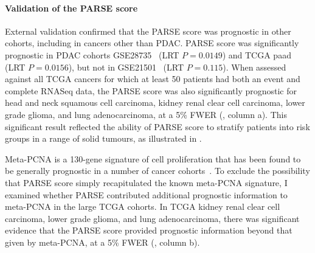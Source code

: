 \documentclass[dissertation.tex]{subfiles}
\begin{document}
\paragraph{Validation of the \acrshort{PARSE} score}
External validation confirmed that the \gls{PARSE} score was prognostic in other cohorts, including in cancers other than \gls{PDAC}.  \Gls{PARSE} score was significantly prognostic in \gls{PDAC} cohorts GSE28735~\cite{Zhang2013} (LRT $P = 0.0149$) and \gls{TCGA} paad (LRT $P = 0.0156$), but not in GSE21501~\cite{Stratford2010} (LRT $P = 0.115$).  When assessed against all \gls{TCGA} cancers for which at least 50 patients had both an event and complete RNASeq data, the \gls{PARSE} score was also significantly prognostic for head and neck squamous cell carcinoma, kidney renal clear cell carcinoma, lower grade glioma, and lung adenocarcinoma, at a 5\% \gls{FWER} (, column a).  This significant result reflected the ability of \acrshort{PARSE} score to stratify patients into risk groups in a range of solid tumours, as illustrated in .

Meta-PCNA is a 130-gene signature of cell proliferation that has been found to be generally prognostic in a number of cancer cohorts~\cite{Venet2011}.  To exclude the possibility that \gls{PARSE} score simply recapitulated the known meta-PCNA signature, I examined whether \gls{PARSE} contributed additional prognostic information to meta-PCNA in the large \gls{TCGA} cohorts.  In \gls{TCGA} kidney renal clear cell carcinoma, lower grade glioma, and lung adenocarcinoma, there was significant evidence that the \gls{PARSE} score provided prognostic information beyond that given by meta-PCNA, at a 5\% \gls{FWER} (, column b).
\end{document}

